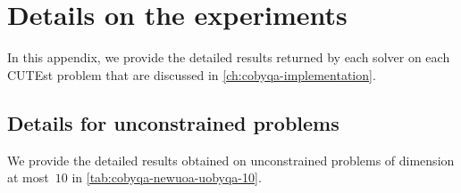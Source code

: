%
%
%
\chapter{Details on the experiments}

In this appendix, we provide the detailed results returned by each solver on each CUTEst problem that are discussed in \cref{ch:cobyqa-implementation}.

\section{Details for unconstrained problems}

We provide the detailed results obtained on unconstrained problems of dimension at most~$10$ in \cref{tab:cobyqa-newuoa-uobyqa-10}.

